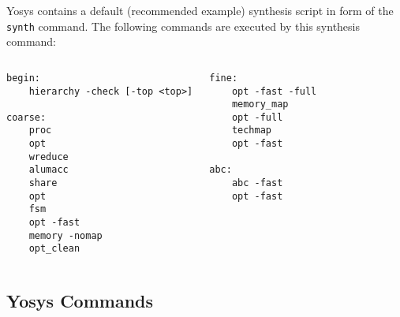 \begin{frame}[fragile]{\subsecname{}}
Yosys contains a default (recommended example) synthesis script in form of the
{\tt synth} command. The following commands are executed by this synthesis command:

\begin{columns}
\column[t]{5cm}
\begin{lstlisting}[xleftmargin=1cm, basicstyle=\ttfamily\fontsize{8pt}{10pt}\selectfont, language=ys]
begin:
    hierarchy -check [-top <top>]

coarse:
    proc
    opt
    wreduce
    alumacc
    share
    opt
    fsm
    opt -fast
    memory -nomap
    opt_clean
\end{lstlisting}
\column[t]{5cm}
\begin{lstlisting}[xleftmargin=1cm, basicstyle=\ttfamily\fontsize{8pt}{10pt}\selectfont, language=ys]
fine:
    opt -fast -full
    memory_map
    opt -full
    techmap
    opt -fast

abc:
    abc -fast
    opt -fast
\end{lstlisting}
\end{columns}
\end{frame}


\subsection{Yosys Commands}


